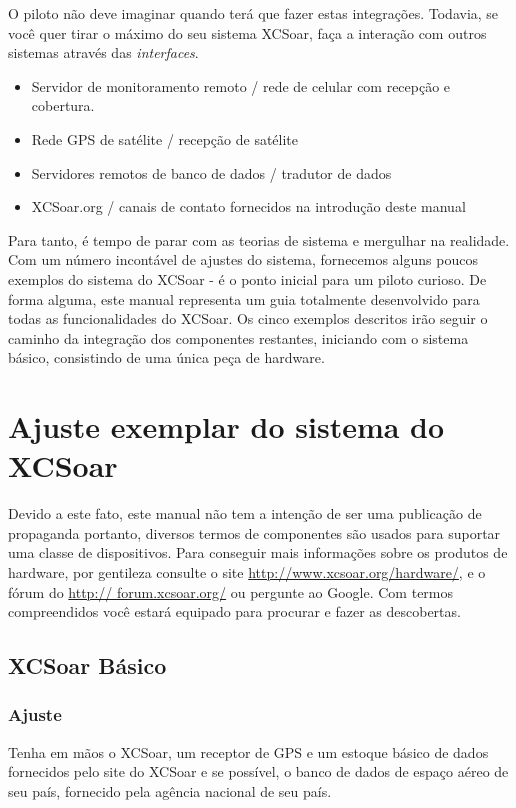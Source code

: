 O piloto não deve imaginar quando terá que fazer estas integrações.  Todavia, se você quer tirar o máximo do seu sistema XCSoar, faça a interação com outros sistemas através das \emph{interfaces}.
\begin{itemize}
\item Servidor de monitoramento remoto / rede de celular com recepção e cobertura.
\item Rede GPS de satélite / recepção de satélite
\item Servidores remotos de banco de dados / tradutor de dados
\item XCSoar.org / canais de contato fornecidos na introdução deste manual
\end{itemize}
Para tanto, é tempo de parar com as teorias de sistema e mergulhar na realidade. Com um número incontável de ajustes do sistema, fornecemos alguns poucos exemplos do sistema do XCSoar - é o ponto inicial para um piloto curioso.  De forma alguma, este manual representa um guia totalmente desenvolvido para todas as funcionalidades do XCSoar. Os cinco exemplos descritos irão seguir o caminho da integração dos componentes restantes, iniciando com o sistema básico, consistindo de uma única peça de hardware. 

\section{Ajuste exemplar do sistema do XCSoar}
Devido a este fato, este manual não tem a intenção de ser uma publicação de propaganda portanto, diversos termos de componentes são usados para suportar uma classe de dispositivos. Para conseguir mais informações sobre os produtos de hardware, por gentileza consulte o site 
\url{http://www.xcsoar.org/hardware/}, e o fórum do  \url{http://
forum.xcsoar.org/} ou pergunte ao Google. Com termos compreendidos você estará equipado para procurar e fazer as descobertas. 

\subsection*{XCSoar Básico}
\subsubsection*{Ajuste} Tenha em mãos o XCSoar, um receptor de GPS e um estoque básico de dados fornecidos pelo site do XCSoar e se possível, o banco de dados de espaço aéreo de seu país, fornecido pela agência nacional de seu país.

